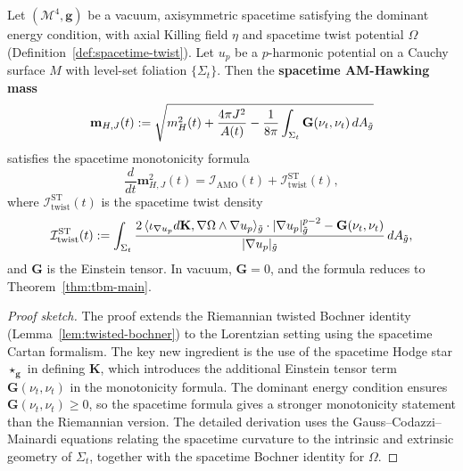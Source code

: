 \begin{theorem}\label{thm:lorentzian-tbm}
Let $(\mathcal{M}^4, \mathbf{g})$ be a vacuum, axisymmetric spacetime satisfying the dominant energy condition, with axial Killing field $\eta$ and spacetime twist potential $\Omega$ (Definition~\ref{def:spacetime-twist}). Let $u_p$ be a $p$-harmonic potential on a Cauchy surface $M$ with level-set foliation $\{\Sigma_t\}$. Then the \textbf{spacetime AM-Hawking mass}
\begin{equation}
\mathbf{m}_{H,J}(t) := \sqrt{m_H^2(t) + \frac{4\pi J^2}{A(t)} - \frac{1}{8\pi}\int_{\Sigma_t} \mathbf{G}(\nu_t, \nu_t) \, dA_{\tilde{g}}}
\end{equation}
satisfies the spacetime monotonicity formula
\begin{equation}\label{eq:lorentzian-tbm}
\frac{d}{dt} \mathbf{m}_{H,J}^2(t) = \mathcal{I}_{\mathrm{AMO}}(t) + \mathcal{I}_{\mathrm{twist}}^{\mathrm{ST}}(t),
\end{equation}
where $\mathcal{I}_{\mathrm{twist}}^{\mathrm{ST}}(t)$ is the spacetime twist density
\begin{equation}
\mathcal{I}_{\mathrm{twist}}^{\mathrm{ST}}(t) := \int_{\Sigma_t} \frac{2\,\langle \iota_{\nabla u_p} d\mathbf{K}, \nabla \Omega \wedge \nabla u_p \rangle_{\tilde{g}} \cdot |\nabla u_p|_{\tilde{g}}^{p-2} - \mathbf{G}(\nu_t, \nu_t)}{|\nabla u_p|_{\tilde{g}}} \, dA_{\tilde{g}},
\end{equation}
and $\mathbf{G}$ is the Einstein tensor. In vacuum, $\mathbf{G} = 0$, and the formula reduces to Theorem~\ref{thm:tbm-main}.
\end{theorem}

\begin{proof}[Proof sketch]
The proof extends the Riemannian twisted Bochner identity (Lemma~\ref{lem:twisted-bochner}) to the Lorentzian setting using the spacetime Cartan formalism. The key new ingredient is the use of the spacetime Hodge star $\star_{\mathbf{g}}$ in defining $\mathbf{K}$, which introduces the additional Einstein tensor term $\mathbf{G}(\nu_t, \nu_t)$ in the monotonicity formula. The dominant energy condition ensures $\mathbf{G}(\nu_t, \nu_t) \geq 0$, so the spacetime formula gives a stronger monotonicity statement than the Riemannian version. The detailed derivation uses the Gauss--Codazzi--Mainardi equations relating the spacetime curvature to the intrinsic and extrinsic geometry of $\Sigma_t$, together with the spacetime Bochner identity for $\Omega$.
\end{proof}

